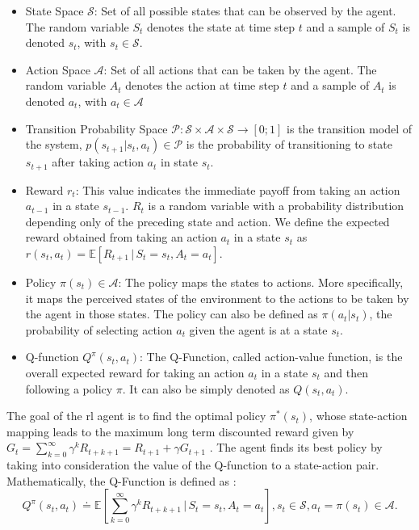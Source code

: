 \begin{itemize}
  \item State Space $\mathcal{S}$: Set of all possible states that can be observed by the agent. The random variable $S_t$ denotes the state at time step $t$ and a sample of $S_t$ is denoted $s_t$, with $s_t \in \mathcal{S}$.
  \item Action Space $\mathcal{A}$: Set of all actions that can be taken by the agent. The random variable $A_t$ denotes the action at time step $t$ and a sample of $A_t$ is denoted $a_t$, with $a_t \in \mathcal{A}$
  \item Transition Probability Space $\mathcal{P}: \mathcal{S} \times \mathcal{A} \times \mathcal{S} \rightarrow [0;1]$ is the transition model of the system, $p(s_{t+1} | s_t,a_t) \in \mathcal{P}$ is the probability of transitioning to state $s_{t+1}$ after taking action $a_t$ in state $s_t$.
  \item Reward  $r_t$: This value indicates the immediate payoff from taking an action $a_{t-1}$ in a state $s_{t-1}$. $R_t$ is a random variable with a probability distribution depending only of the preceding state and action. We define the expected reward obtained from taking an action $a_t$ in a state $s_t$ as $r(s_t,a_t) = \mathbb{E}\left[R_{t+1} \, | \, S_t = s_t, A_t = a_t \right] $.
  \item Policy $\pi(s_t) \in \mathcal{A} $: The policy maps the states to actions. More specifically, it maps the perceived states of the environment to the actions to be taken by the agent in those states. The policy can also be defined as $\pi(a_t | s_t)$, the probability of selecting action $a_t$ given the agent is at a state $s_t$.
  \item Q-function $Q^{\pi}(s_t,a_t)$:  The Q-Function, called action-value function, is the overall expected reward for taking an action $a_t$ in a state $s_t$ and then following a policy $\pi$. It can also be simply denoted as $Q(s_t,a_t)$.
\end{itemize}


The goal of the \gls{rl} agent is to find the optimal policy $\pi^{*}(s_t)$, whose state-action mapping leads to the maximum long term discounted reward given by $G_t = \sum_{k=0}^{\infty} \gamma^{k} R_{t+k+1} = R_{t+1} + \gamma G_{t+1} $ \cite{kaelbling1996reinforcement}.
%
The agent finds its best policy by taking into consideration the value of the Q-function to a state-action pair.
%
Mathematically, the Q-Function is defined as \cite{2010Szepesvari}:
\begin{equation} \label{eq.:eqQvalue}
  Q^{\pi}(s_t, a_t) \doteq \mathbb{E}\left[\sum_{k=0}^{\infty} \gamma^{k} R_{t+k+1} \, | \, S_t = s_t, A_t = a_t \right], s_t \in \mathcal{S}, a_t = \pi (s_t) \in \mathcal{A}.
\end{equation}


